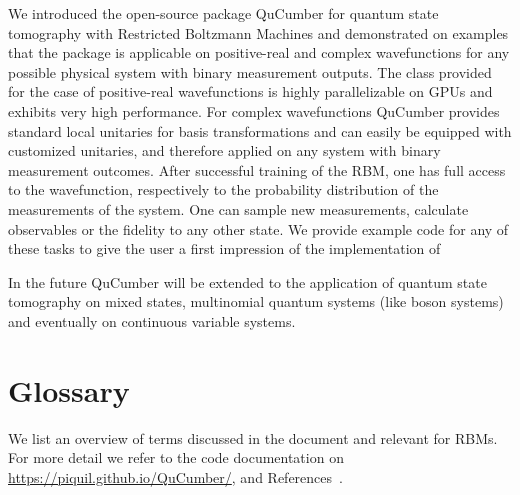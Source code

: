 \documentclass[submission, Phys]{SciPost}
\begin{document}
We introduced the open-source package QuCumber for quantum state tomography with Restricted Boltzmann Machines and demonstrated on examples that
the package is applicable on positive-real and complex wavefunctions for any possible physical system with binary measurement outputs. 
The class provided for the case of positive-real wavefunctions is highly parallelizable on GPUs and exhibits very high performance. 
For complex wavefunctions QuCumber provides standard local unitaries for basis transformations 
and can easily be equipped with customized unitaries, and therefore applied on any system with binary measurement outcomes.
After successful training of the RBM, one has full access to the wavefunction, respectively to the probability distribution of the measurements of the system. 
One can sample new measurements, calculate observables or the fidelity to any other state. 
We provide example code for any of these tasks to give the user a first impression of the implementation of 

In the future QuCumber will be extended to the application of quantum state tomography on mixed states, multinomial quantum systems (like boson systems) and eventually on continuous variable systems.

\section{Glossary}
\label{Glossary}

We list an overview of terms discussed in the document and relevant for RBMs. For more detail we refer to the code documentation on \url{https://piquil.github.io/QuCumber/}, and References~\cite{hinton2002training, hinton2012practical}.
\end{document}
